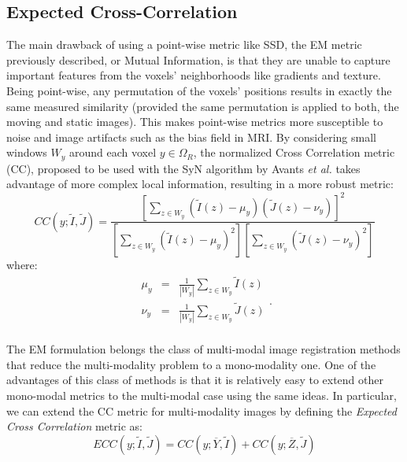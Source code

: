 \subsection{Expected Cross-Correlation}\label{sec:syn_ecc}
The main drawback of using a point-wise metric like SSD, the EM metric previously described, or Mutual Information, is that
they are unable to capture important features from the voxels' neighborhoods like gradients and texture. Being point-wise, any permutation of the voxels' positions results in
exactly the same measured similarity (provided the same permutation is applied to both, the moving and static images). This makes point-wise metrics more susceptible to noise and
image artifacts such as the bias field in MRI. By considering small windows $W_{y}$ around each voxel $y\in\Omega_{R}$, the normalized Cross Correlation metric (CC), proposed to
be used with the SyN algorithm by Avants {\it et al.} \cite{Avants2008} takes advantage of more complex local information, resulting in a more robust metric:
\begin{equation}
    CC(y;\tilde{I}, \tilde{J}) = \frac{\left[\sum_{z\in W_{y}} \left(\tilde{I}(z) - \mu_{y}\right)\left(\tilde{J}(z) - \nu_{y}\right)\right]^{2}}
    {\left[\sum_{z \in W_{y}}\left(\tilde{I}(z) - \mu_{y}\right)^{2}\right] \left[\sum_{z \in W_{y}}\left(\tilde{J}(z) - \nu_{y}\right)^{2}\right]}
\end{equation}
where:
\begin{equation}
    \begin{array}{lll}
        \mu_{y} &=& \frac{1}{|W_{y}|}\sum_{z \in W_{y}}\tilde{I}(z)\\
        \nu_{y} &=& \frac{1}{|W_{y}|}\sum_{z \in W_{y}}\tilde{J}(z)\\
    \end{array}.
\end{equation}

The EM formulation belongs the class of multi-modal image registration methods that reduce the multi-modality problem to a mono-modality one\cite{Sotiras2013}. One of the
advantages of this class of methods is that it is relatively easy to extend other mono-modal metrics to the multi-modal case using the same ideas. In particular, we can extend the CC metric for multi-modality images by defining the {\it Expected Cross Correlation} metric as:
\begin{equation}
    ECC(y;\tilde{I}, \tilde{J}) = CC(y; \overline{Y}, \tilde{I}) + CC(y; \overline{Z}, \tilde{J})
\end{equation}

